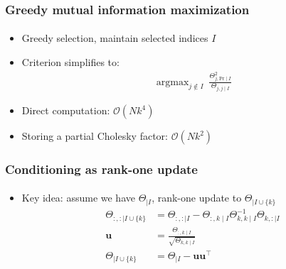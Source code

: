 \documentclass{beamer}                             %
\renewcommand{\vec}[1]{\bm{#1}}
\renewcommand{\vec}[1]{\bm{#1}}
\DeclareMathOperator*{\argmax}{argmax}
\begin{document}
\begin{frame}
\frametitle{Greedy mutual information maximization}
\framesubtitle{}
\begin{itemize}
  \item<+-> Greedy selection, maintain selected indices \( I \)
  \item<+-> Criterion simplifies to:
    \begin{align*}
        \argmax_{j \not \in I} \:
          \frac{\Theta_{j, \text{Pr} \mid I}^2}{\Theta_{j, j \mid I}}
    \end{align*}
  \item<+-> Direct computation: \( \mathcal{O}(N k^4) \)
  \item<+-> Storing a partial Cholesky factor: \( \mathcal{O}(N k^2) \)
\end{itemize}
\end{frame}

\begin{frame}
\frametitle{Conditioning as rank-one update}
\framesubtitle{}
\begin{itemize}
  \item<+-> Key idea: assume we have \( \Theta_{\mid I} \),
    rank-one update to \( \Theta_{\mid I \cup \{ k \}} \)
    \begin{align*}
      \Theta_{:, : \mid I \cup \{ k \}} &= \Theta_{:, : \mid I} -
        \Theta_{:, k \mid I} \Theta_{k, k \mid I}^{-1} \Theta_{k, : \mid I} \\
      \vec{u} &= \frac{\Theta_{:, k \mid I}}{\sqrt{\Theta_{k, k \mid I}}} \\
      \Theta_{\mid I \cup \{ k \}} &= \Theta_{\mid I} - \vec{u} \vec{u}^{\top}
    \end{align*}
\end{itemize}
\end{frame}
\end{document}
